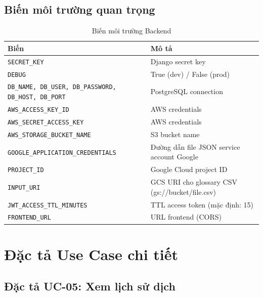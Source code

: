 \section{Biến môi trường quan trọng}

\begin{table}[H]
\centering
\caption{Biến môi trường Backend}
\renewcommand{\arraystretch}{1.3}
\begin{tabularx}{\textwidth}{|l|X|}
\hline
\textbf{Biến}                         & \textbf{Mô tả} \\
\hline
\texttt{SECRET\_KEY}                   & Django secret key \\
\hline
\texttt{DEBUG}                         & True (dev) / False (prod) \\
\hline
\texttt{DB\_NAME, DB\_USER, DB\_PASSWORD, DB\_HOST, DB\_PORT} & PostgreSQL connection \\
\hline
\texttt{AWS\_ACCESS\_KEY\_ID}           & AWS credentials \\
\hline
\texttt{AWS\_SECRET\_ACCESS\_KEY}       & AWS credentials \\
\hline
\texttt{AWS\_STORAGE\_BUCKET\_NAME}     & S3 bucket name \\
\hline
\texttt{GOOGLE\_APPLICATION\_CREDENTIALS} & Đường dẫn file JSON service account Google \\
\hline
\texttt{PROJECT\_ID}                   & Google Cloud project ID \\
\hline
\texttt{INPUT\_URI}                    & GCS URI cho glossary CSV (gs://bucket/file.csv) \\
\hline
\texttt{JWT\_ACCESS\_TTL\_MINUTES}      & TTL access token (mặc định: 15) \\
\hline
\texttt{FRONTEND\_URL}                 & URL frontend (CORS) \\
\hline
\end{tabularx}
\end{table}

\chapter{Đặc tả Use Case chi tiết}
\label{app:usecase}

\section{Đặc tả UC-05: Xem lịch sử dịch}

